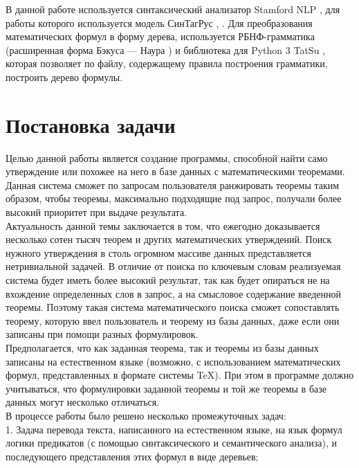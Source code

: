 \documentclass[12pt]{article}
\begin{document}
В данной работе используется синтаксический анализатор Stamford NLP \cite{author14}, для работы которого используется модель СинТагРус \cite{author16}, \cite{author17}. Для преобразования математических формул в форму дерева, используется РБНФ-грамматика (расширенная форма Бэкуса — Наура \cite{author13}) и библиотека для Python 3 TatSu \cite{author15}, которая позволяет по файлу, содержащему правила построения грамматики, построить дерево формулы.

\newpage
\section*{Постановка задачи}

Целью данной работы является создание программы, способной найти само утверждение или похожее на него в базе данных с математическими теоремами.\\

Данная система сможет по запросам пользователя ранжировать теоремы таким образом, чтобы теоремы, максимально подходящие под запрос, получали более высокий приоритет при выдаче результата. \\

Актуальность данной темы заключается в том, что ежегодно доказывается несколько сотен тысяч теорем и других математических утверждений. Поиск нужного утверждения в столь огромном массиве данных представляется нетривиальной задачей. В отличие от поиска по ключевым словам реализуемая система будет иметь более высокий результат, так как будет опираться не на вхождение определенных слов в запрос, а на смысловое содержание введенной теоремы. Поэтому такая система математического поиска сможет сопоставлять теорему, которую ввел пользователь и теорему из базы данных, даже если они записаны при помощи разных формулировок.  \\

Предполагается, что как заданная теорема, так и теоремы из базы данных записаны на естественном языке (возможно, с использованием математических формул, представленных в формате системы TeX). При этом в программе должно
учитываться, что формулировки заданной теоремы и той же теоремы в базе данных могут несколько отличаться.  \\

В процессе работы  было решено несколько промежуточных задач: \\

1. Задача перевода текста, написанного на естественном языке, на язык формул логики предикатов (с помощью синтаксического и семантического анализа), и последующего представления этих формул в виде деревьев; \\
\end{document}
